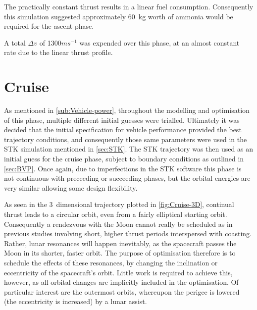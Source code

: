 The practically constant thrust results in a linear fuel consumption. Consequently this simulation suggested approximately 60~kg worth of ammonia would be required for the ascent phase. %

A total $\Delta v$ of 1300$ms^{-1}$ was expended over this phase, at an almost constant rate due to the linear thrust profile. %

%


\clearpage

\section{Cruise} \label{sec:Cruise}
As mentioned in \autoref{sub:Vehicle-power}, throughout the modelling and optimisation of this phase, multiple different initial guesses were trialled. Ultimately it was decided that the initial specification for vehicle performance provided the best trajectory conditions, and consequently those same parameters were used in the STK simulation mentioned in \autoref{sec:STK}. The STK trajectory was then used as an initial guess for the cruise phase, subject to boundary conditions as outlined in \autoref{sec:BVP}. Once again, due to imperfections in the STK software this phase is not continuous with preceeding or succeeding phases, but the orbital energies are very similar allowing some design flexibility.

As seen in the 3~dimensional trajectory plotted in \autoref{fig:Cruise-3D}, continual thrust leads to a circular orbit, even from a fairly elliptical starting orbit. Consequently a rendezvous with the Moon cannot really be scheduled as in previous studies involving short, higher thrust periods interspersed with coasting. Rather, lunar resonances will happen inevitably, as the spacecraft passes the Moon in its shorter, faster orbit. The purpose of optimisation therefore is to schedule the effects of these resonances, by changing the inclination or eccentricity of the spacecraft's orbit. Little work is required to achieve this, however, as all orbital changes are implicitly included in the optimisation. Of particular interest are the outermost orbits, whereupon the perigee is lowered (the eccentricity is increased) by a lunar assist.

